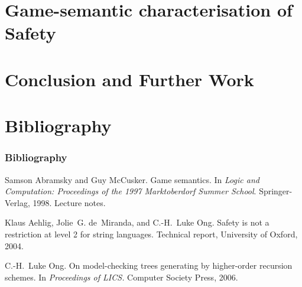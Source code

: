 
\section{Game-semantic characterisation of Safety}


\section{Conclusion and Further Work}

\section{Bibliography}
\begin{frame} \frametitle<presentation>{Bibliography}

  \begin{thebibliography}{10}
  \beamertemplatearticlebibitems
    Samson Abramsky and Guy McCusker.
    \newblock Game semantics.
    \newblock In {\em Logic and Computation: Proceedings of the 1997 Marktoberdorf
      Summer School}. Springer-Verlag, 1998.
    \newblock Lecture notes.
    
    Klaus Aehlig, Jolie~G. de~Miranda, and C.-H.~Luke Ong.
    \newblock Safety is not a restriction at level 2 for string languages.
    \newblock Technical report, University of Oxford, 2004.
    
    C.-H.~Luke Ong.
    \newblock On model-checking trees generating by higher-order recursion schemes.
    \newblock In {\em Proceedings of LICS.} Computer Society Press, 2006.
  \end{thebibliography}
\end{frame}


